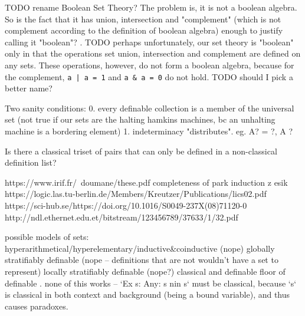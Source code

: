 \documentclass[oneside,12pt]{book}
\theoremstyle{definition}
\theoremstyle{remark}
\newcommand{\tde}{\raisebox{0.5ex}{\texttildelow}}
\begin{document}
TODO rename Boolean Set Theory? The problem is, it is not a boolean algebra.
So is the fact that it has union, intersection and "complement" (which
is not complement according to the definition of boolean algebra) enough
to justify calling it "boolean"?
.
TODO perhaps unfortunately, our set theory is "boolean" only in that
the operations set union, intersection and complement are defined on any sets.
These operations, however, do not form a boolean algebra, because for the
complement, \texttt{a | \tde a = 1} and \texttt{a \& \tde a = 0} do not hold.
TODO should I pick a better name?

Two sanity conditions:
0. every definable collection is a member of the universal set (not true
if our sets are the halting hamkins machines, bc an unhalting machine is
a bordering element)
1. indeterminacy "distributes". eg. { { A? } } = { {}?, { A }? }

Is there a classical triset of pairs that can only be defined in a non-classical
definition list?

https://www.irif.fr/~doumane/these.pdf
completeness of park induction  z esik
https://logic.las.tu-berlin.de/Members/Kreutzer/Publications/lics02.pdf
https://sci-hub.se/https://doi.org/10.1016/S0049-237X(08)71120-0
http://ndl.ethernet.edu.et/bitstream/123456789/37633/1/32.pdf

possible models of sets:
hyperarithmetical/hyperelementary/inductive\&coinductive (nope)
globally stratifiably definable (nope -- definitions that are not wouldn't have a set to represent)
locally stratifiably definable (nope?)
classical and definable
floor of definable
.
none of this works -- `Ex s: Any: s nin s` must be classical, because `s` is classical
in both context and background (being a bound variable), and thus causes paradoxes.
\end{document}
